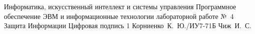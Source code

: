 \documentclass{bmstu}
\begin{document}
\makereporttitle
    {Информатика, искусственный интеллект и системы управления} %
    {Программное обеспечение ЭВМ и информационные технологии} %
    {лабораторной работе №~4} %
    {Защита Информации} %
    {Цифровая подпись} %
    {1} %
    {Корниенко~К.~Ю./ИУ7-71Б} %
    {Чиж~И.~С.} %

\maketableofcontents






\makebibliography
\end{document}
